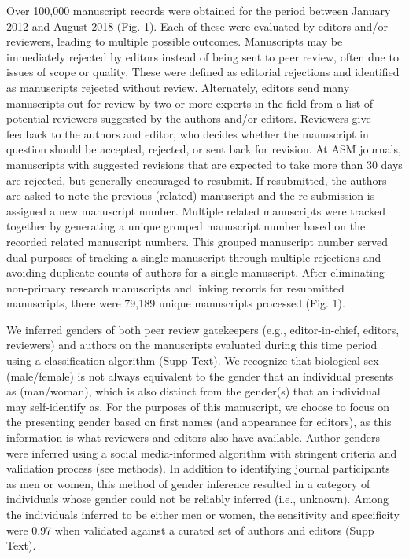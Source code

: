 \documentclass[11pt,]{article}
\begin{document}
Over 100,000 manuscript records were obtained for the period between
January 2012 and August 2018 (Fig. 1). Each of these were evaluated by
editors and/or reviewers, leading to multiple possible outcomes.
Manuscripts may be immediately rejected by editors instead of being sent
to peer review, often due to issues of scope or quality. These were
defined as editorial rejections and identified as manuscripts rejected
without review. Alternately, editors send many manuscripts out for
review by two or more experts in the field from a list of potential
reviewers suggested by the authors and/or editors. Reviewers give
feedback to the authors and editor, who decides whether the manuscript
in question should be accepted, rejected, or sent back for revision. At
ASM journals, manuscripts with suggested revisions that are expected to
take more than 30 days are rejected, but generally encouraged to
resubmit. If resubmitted, the authors are asked to note the previous
(related) manuscript and the re-submission is assigned a new manuscript
number. Multiple related manuscripts were tracked together by generating
a unique grouped manuscript number based on the recorded related
manuscript numbers. This grouped manuscript number served dual purposes
of tracking a single manuscript through multiple rejections and avoiding
duplicate counts of authors for a single manuscript. After eliminating
non-primary research manuscripts and linking records for resubmitted
manuscripts, there were 79,189 unique manuscripts processed (Fig. 1).

We inferred genders of both peer review gatekeepers (e.g.,
editor-in-chief, editors, reviewers) and authors on the manuscripts
evaluated during this time period using a classification algorithm (Supp
Text). We recognize that biological sex (male/female) is not always
equivalent to the gender that an individual presents as (man/woman),
which is also distinct from the gender(s) that an individual may
self-identify as. For the purposes of this manuscript, we choose to
focus on the presenting gender based on first names (and appearance for
editors), as this information is what reviewers and editors also have
available. Author genders were inferred using a social media-informed
algorithm with stringent criteria and validation process (see methods).
In addition to identifying journal participants as men or women, this
method of gender inference resulted in a category of individuals whose
gender could not be reliably inferred (i.e., unknown). Among the
individuals inferred to be either men or women, the sensitivity and
specificity were 0.97 when validated against a curated set of authors
and editors (Supp Text).
\end{document}
